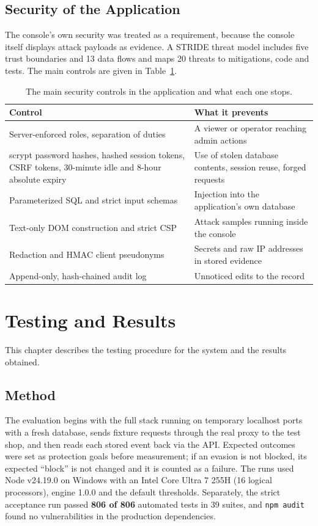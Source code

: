 \documentclass{FastFyp}
\newenvironment{rtab}{\small\singlespacing\renewcommand{\arraystretch}{1.3}}{}
\begin{document}
\section{Security of the Application}
The console's own security was treated as a requirement, because the console itself displays attack payloads as evidence. A STRIDE threat model \cite{ref:shostack} includes five trust boundaries and 13 data flows and maps 20 threats to mitigations, code and tests. The main controls are given in Table~\ref{tab:controls}.

\begin{table}[!htb]
\centering
\caption{The main security controls in the application and what each one stops.}
\begin{rtab}
\begin{tabular}{|p{7.0cm}|p{6.5cm}|}
\hline
\textbf{Control} & \textbf{What it prevents} \\
\hline
Server-enforced roles, separation of duties & A viewer or operator reaching admin actions \\
\hline
scrypt password hashes, hashed session tokens, CSRF tokens, 30-minute idle and 8-hour absolute expiry & Use of stolen database contents, session reuse, forged requests \\
\hline
Parameterized SQL and strict input schemas & Injection into the application's own database \\
\hline
Text-only DOM construction and strict CSP & Attack samples running inside the console \\
\hline
Redaction and HMAC client pseudonyms & Secrets and raw IP addresses in stored evidence \\
\hline
Append-only, hash-chained audit log & Unnoticed edits to the record \\
\hline
\end{tabular}
\end{rtab}
\label{tab:controls}
\end{table}

\chapter{Testing and Results}
This chapter describes the testing procedure for the system and the results obtained.

\section{Method}
The evaluation begins with the full stack running on temporary localhost ports with a fresh database, sends fixture requests through the real proxy to the test shop, and then reads each stored event back via the API. Expected outcomes were set as protection goals before measurement; if an evasion is not blocked, its expected ``block'' is not changed and it is counted as a failure. The runs used Node v24.19.0 on Windows with an Intel Core Ultra 7 255H (16 logical processors), engine 1.0.0 and the default thresholds. Separately, the strict acceptance run passed \textbf{806 of 806} automated tests in 39 suites, and \texttt{npm audit} found no vulnerabilities in the production dependencies.
\end{document}
